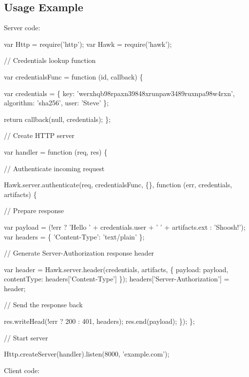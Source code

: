 \subsection*{Usage Example}

Server code\+:


\begin{DoxyCode}
var Http = require('http');
var Hawk = require('hawk');


// Credentials lookup function

var credentialsFunc = function (id, callback) \{

    var credentials = \{
        key: 'werxhqb98rpaxn39848xrunpaw3489ruxnpa98w4rxn',
        algorithm: 'sha256',
        user: 'Steve'
    \};

    return callback(null, credentials);
\};

// Create HTTP server

var handler = function (req, res) \{

    // Authenticate incoming request

    Hawk.server.authenticate(req, credentialsFunc, \{\}, function (err, credentials, artifacts) \{

        // Prepare response

        var payload = (!err ? 'Hello ' + credentials.user + ' ' + artifacts.ext : 'Shoosh!');
        var headers = \{ 'Content-Type': 'text/plain' \};

        // Generate Server-Authorization response header

        var header = Hawk.server.header(credentials, artifacts, \{ payload: payload, contentType:
       headers['Content-Type'] \});
        headers['Server-Authorization'] = header;

        // Send the response back

        res.writeHead(!err ? 200 : 401, headers);
        res.end(payload);
    \});
\};

// Start server

Http.createServer(handler).listen(8000, 'example.com');
\end{DoxyCode}


Client code\+:


